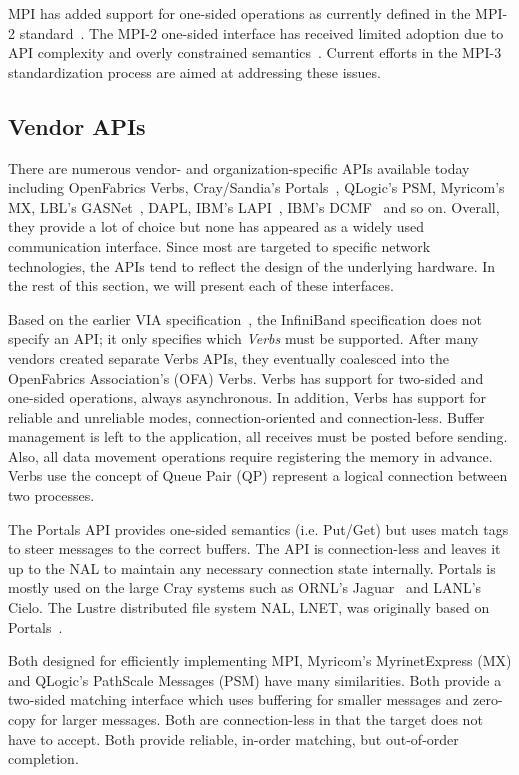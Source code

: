 MPI has added support for one-sided operations as currently defined
in the MPI-2 standard~\cite{geist96:_mpi2_lyon}. The MPI-2 one-sided
interface has received limited adoption due to API complexity and
overly constrained semantics~\cite{bonachea-upc-mpi2}. Current efforts
in the MPI-3 standardization process are aimed at addressing these
issues. 


\subsection{Vendor APIs} There are numerous vendor- and
organization-specific APIs available today including OpenFabrics
Verbs, Cray/Sandia's Portals~\cite{portals}, QLogic's
PSM, Myricom's MX, LBL's GASNet~\cite{gasnet}, 
DAPL, IBM's LAPI~\cite{lapi_a_1998}, IBM's 
DCMF~\cite{Kumar:2008:DCM:1375527.1375544} and so on. 
Overall, they provide a lot of choice but none has appeared as 
a widely used communication interface. Since most are targeted to 
specific network technologies, the APIs tend to reflect the design 
of the underlying hardware. In the rest of this section, we will 
present each of these interfaces.

Based on the earlier VIA specification~\cite{via}, the InfiniBand specification does not specify
an API; it only specifies which \emph{Verbs} must be supported. After many vendors created
separate Verbs APIs, they eventually coalesced into the OpenFabrics Association's (OFA)
Verbs. Verbs has support for two-sided and one-sided operations, always asynchronous. 
In addition, Verbs has support for reliable and unreliable modes, connection-oriented
and connection-less. Buffer management is left to the application, all receives must be 
posted before sending. Also, all data movement operations require registering the memory 
in advance. Verbs use the concept of Queue Pair (QP) represent a logical connection between 
two processes.

The Portals API provides one-sided semantics (i.e.  Put/Get) but uses match tags to steer
messages to the correct buffers. The API is connection-less and leaves it up to the NAL to
maintain any necessary connection state internally. Portals is mostly used on the large
Cray systems such as ORNL's Jaguar~\cite{jaguar_cug_2010} and LANL's Cielo.  The
Lustre distributed file system NAL, LNET, was originally based on Portals~\cite{lnet}.

Both designed for efficiently implementing MPI, Myricom's MyrinetExpress (MX) and 
QLogic's PathScale Messages (PSM) have many similarities. Both provide a two-sided matching 
interface which uses buffering for smaller messages and zero-copy for larger messages.  
Both are connection-less in that the target does not have to accept.  Both provide reliable,
in-order matching, but out-of-order completion.

